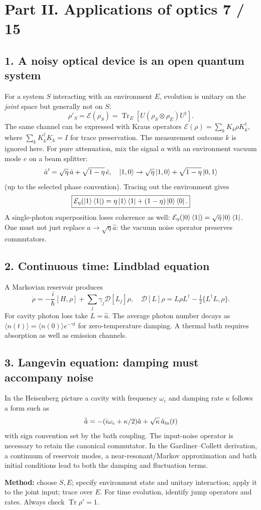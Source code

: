 
\section*{Part II. Applications of optics \hfill 7 / 15}
\subsection*{1. A noisy optical device is an open quantum system}
For a system \(S\) interacting with an environment \(E\), evolution
is unitary on the \emph{joint} space but generally not on \(S\):
\[
\boxed{\rho'_S=\mathcal E(\rho_S)
=\operatorname{Tr}_E[U(\rho_S\otimes\rho_E)U^\dagger].}
\]
The same channel can be expressed with Kraus operators
\(\mathcal E(\rho)=\sum_kK_k\rho K_k^\dagger\),
where \(\sum_kK_k^\dagger K_k=I\) for trace preservation.
The measurement outcome \(k\) is ignored here.
For pure attenuation, mix the signal \(a\) with an
environment vacuum mode \(e\) on a beam splitter:
\[
\hat a'=\sqrt\eta\,\hat a+\sqrt{1-\eta}\,\hat e,
\quad
\left\lvert 1,0\right\rangle\to\sqrt\eta\left\lvert 1,0\right\rangle
+\sqrt{1-\eta}\left\lvert 0,1\right\rangle
\]
(up to the selected phase convention).
Tracing out the environment gives
\[
\boxed{\mathcal E_\eta(\left\lvert 1\right\rangle\left\langle 1\right\rvert)
=\eta\left\lvert 1\right\rangle\left\langle 1\right\rvert+(1-\eta)\left\lvert 0\right\rangle\left\langle 0\right\rvert.}
\]
A single-photon superposition loses coherence as well:
\(\mathcal E_\eta(\left\lvert 0\right\rangle\left\langle 1\right\rvert)=\sqrt\eta\left\lvert 0\right\rangle\left\langle 1\right\rvert\).
One must not just replace \(\hat a\to\sqrt\eta\hat a\):
the vacuum noise operator preserves commutators.

\subsection*{2. Continuous time: Lindblad equation}
A Markovian reservoir produces
\[
\boxed{\dot\rho=-\frac{i}{\hbar}[H,\rho]
+\sum_j\gamma_j\mathcal D[L_j]\rho},\quad
\mathcal D[L]\rho=L\rho L^\dagger
-\tfrac12\{L^\dagger L,\rho\}.
\]
For cavity photon loss take \(L=\hat a\). The average photon
number decays as \(\langle n(t)\rangle=\langle n(0)\rangle e^{-\gamma t}\)
for zero-temperature damping. A thermal bath requires absorption
as well as emission channels.

\subsection*{3. Langevin equation: damping must accompany noise}
In the Heisenberg picture a cavity with frequency \(\omega_c\)
and damping rate \(\kappa\) follows a form such as
\[
\dot{\hat a}=-(i\omega_c+\kappa/2)\hat a
+\sqrt\kappa\,\hat a_{\rm in}(t)
\]
with sign convention set by the bath coupling.
The input-noise operator is necessary to retain the
canonical commutator. In the Gardiner--Collett derivation,
a continuum of reservoir modes, a near-resonant/Markov
approximation and bath initial conditions lead to both the
damping and fluctuation terms.

\begin{methodbox}
\textbf{Method:} choose \(S,E\); specify environment state and
unitary interaction; apply it to the joint input; trace over
\(E\). For time evolution, identify jump operators and rates.
Always check \(\operatorname{Tr}\rho'=1\).
\end{methodbox}
